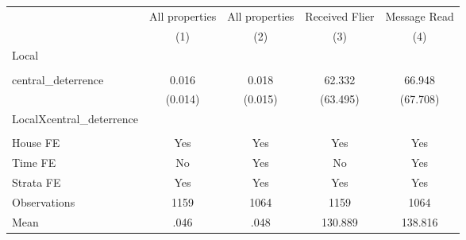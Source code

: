 {
\def\sym#1{\ifmmode^{#1}\else\(^{#1}\)\fi}
\begin{tabular}{l*{4}{c}}
\hline\hline
                &\multicolumn{1}{c}{All properties}&\multicolumn{1}{c}{All properties}&\multicolumn{1}{c}{Received Flier}&\multicolumn{1}{c}{Message Read}\\
                &\multicolumn{1}{c}{(1)}         &\multicolumn{1}{c}{(2)}         &\multicolumn{1}{c}{(3)}         &\multicolumn{1}{c}{(4)}         \\
\hline
Local           &                  &                  &                  &                  \\
                &                  &                  &                  &                  \\
central\_deterrence&    0.016         &    0.018         &   62.332         &   66.948         \\
                &  (0.014)         &  (0.015)         & (63.495)         & (67.708)         \\
LocalXcentral\_deterrence&                  &                  &                  &                  \\
                &                  &                  &                  &                  \\
House FE        &      Yes         &      Yes         &      Yes         &      Yes         \\
Time FE         &       No         &      Yes         &       No         &      Yes         \\
Strata FE       &      Yes         &      Yes         &      Yes         &      Yes         \\
\hline
Observations    &     1159         &     1064         &     1159         &     1064         \\
Mean            &     .046         &     .048         &  130.889         &  138.816         \\
\hline\hline
\end{tabular}
}
